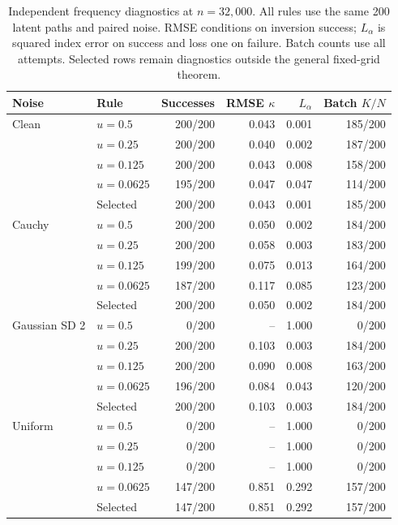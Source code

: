 \documentclass[11pt,a4paper]{article}
\theoremstyle{remark}\newtheorem{remark}[theorem]{Remark}
\begin{document}
\begin{table}[htbp]
\centering\small
\caption{Independent frequency diagnostics at $n=32{,}000$. All rules use the same 200 latent paths and paired noise. RMSE conditions on inversion success; $L_\alpha$ is squared index error on success and loss one on failure. Batch counts use all attempts. Selected rows remain diagnostics outside the general fixed-grid theorem.}\label{tab:frequency}
\begin{tabular}{llrrrr}\toprule
Noise & Rule & Successes & RMSE $\kappa$ & $L_\alpha$ & Batch $K/N$ \\ \midrule
Clean & $u=0.5$ & 200/200 & 0.043 & 0.001 & 185/200 \\
 & $u=0.25$ & 200/200 & 0.040 & 0.002 & 187/200 \\
 & $u=0.125$ & 200/200 & 0.043 & 0.008 & 158/200 \\
 & $u=0.0625$ & 195/200 & 0.047 & 0.047 & 114/200 \\
 & Selected & 200/200 & 0.043 & 0.001 & 185/200 \\
\addlinespace[0.6ex]
Cauchy & $u=0.5$ & 200/200 & 0.050 & 0.002 & 184/200 \\
 & $u=0.25$ & 200/200 & 0.058 & 0.003 & 183/200 \\
 & $u=0.125$ & 199/200 & 0.075 & 0.013 & 164/200 \\
 & $u=0.0625$ & 187/200 & 0.117 & 0.085 & 123/200 \\
 & Selected & 200/200 & 0.050 & 0.002 & 184/200 \\
\addlinespace[0.6ex]
Gaussian SD 2 & $u=0.5$ & 0/200 & -- & 1.000 & 0/200 \\
 & $u=0.25$ & 200/200 & 0.103 & 0.003 & 184/200 \\
 & $u=0.125$ & 200/200 & 0.090 & 0.008 & 163/200 \\
 & $u=0.0625$ & 196/200 & 0.084 & 0.043 & 120/200 \\
 & Selected & 200/200 & 0.103 & 0.003 & 184/200 \\
\addlinespace[0.6ex]
Uniform & $u=0.5$ & 0/200 & -- & 1.000 & 0/200 \\
 & $u=0.25$ & 0/200 & -- & 1.000 & 0/200 \\
 & $u=0.125$ & 0/200 & -- & 1.000 & 0/200 \\
 & $u=0.0625$ & 147/200 & 0.851 & 0.292 & 157/200 \\
 & Selected & 147/200 & 0.851 & 0.292 & 157/200 \\
\bottomrule\end{tabular}
\end{table}
\end{document}

